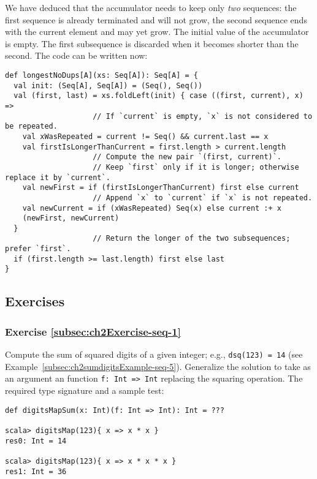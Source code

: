 We have deduced that the accumulator needs to keep only \emph{two}
sequences: the first sequence is already terminated and will not grow,
the second sequence ends with the current element and may yet grow.
The initial value of the accumulator is empty. The first subsequence
is discarded when it becomes shorter than the second. The code can
be written now:
\begin{lstlisting}
def longestNoDups[A](xs: Seq[A]): Seq[A] = {
  val init: (Seq[A], Seq[A]) = (Seq(), Seq())
  val (first, last) = xs.foldLeft(init) { case ((first, current), x) =>
                    // If `current` is empty, `x` is not considered to be repeated.
    val xWasRepeated = current != Seq() && current.last == x
    val firstIsLongerThanCurrent = first.length > current.length
                    // Compute the new pair `(first, current)`.
                    // Keep `first` only if it is longer; otherwise replace it by `current`.
    val newFirst = if (firstIsLongerThanCurrent) first else current
                    // Append `x` to `current` if `x` is not repeated.
    val newCurrent = if (xWasRepeated) Seq(x) else current :+ x
    (newFirst, newCurrent)
  }
                    // Return the longer of the two subsequences; prefer `first`.
  if (first.length >= last.length) first else last
}
\end{lstlisting}


\subsection{Exercises}

\subsubsection{Exercise \label{subsec:ch2Exercise-seq-1}\ref{subsec:ch2Exercise-seq-1}}

Compute the sum of squared digits of a given integer; e.g., \lstinline!dsq(123) = 14!
(see Example~\ref{subsec:ch2sumdigitsExample-seq-5}). Generalize
the solution to take as an argument an function \lstinline!f: Int => Int!
replacing the squaring operation. The required type signature and
a sample test:
\begin{lstlisting}
def digitsMapSum(x: Int)(f: Int => Int): Int = ???

scala> digitsMap(123){ x => x * x }
res0: Int = 14

scala> digitsMap(123){ x => x * x * x }
res1: Int = 36
\end{lstlisting}


